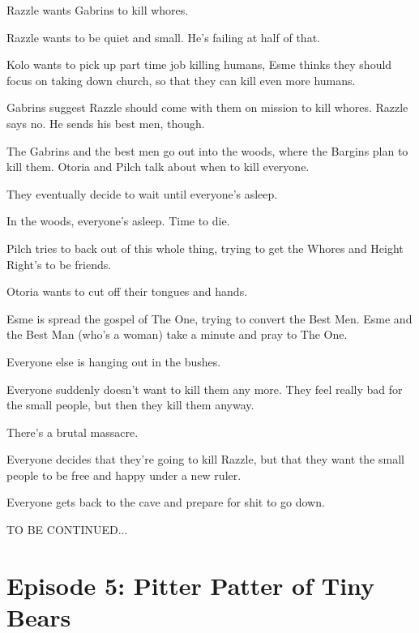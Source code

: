 \documentclass[letterpaper,10pt,twoside,twocolumn,openany]{book}
\begin{document}
Razzle wants Gabrins to kill whores.

Razzle wants to be quiet and small. He’s failing at half of that.

Kolo wants to pick up part time job killing humans, Esme thinks they should focus on taking down church, so that they can kill even more humans.

Gabrins suggest Razzle should come with them on mission to kill whores. Razzle says no. He sends his best men, though.

The Gabrins and the best men go out into the woods, where the Bargins plan to kill them. Otoria and Pilch talk about when to kill everyone.

They eventually decide to wait until everyone’s asleep.

In the woods, everyone’s asleep. Time to die.

Pilch tries to back out of this whole thing, trying to get the Whores and Height Right’s to be friends.

Otoria wants to cut off their tongues and hands.

Esme is spread the gospel of The One, trying to convert the Best Men. Esme and the Best Man (who’s a woman) take a minute and pray to The One.

Everyone else is hanging out in the bushes.

Everyone suddenly doesn’t want to kill them any more. They feel really bad for the small people, but then they kill them anyway.

There’s a brutal massacre.

Everyone decides that they’re going to kill Razzle, but that they want the small people to be free and happy under a new ruler.

Everyone gets back to the cave and prepare for shit to go down.

TO BE CONTINUED...



\clearpage

\section{Episode 5: Pitter Patter of Tiny Bears}
\end{document}
